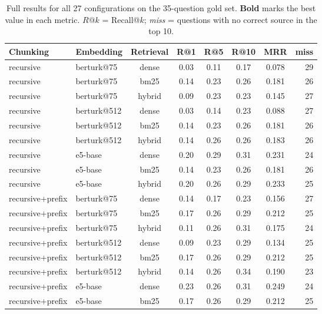 \documentclass[11pt,a4paper,twocolumn]{article}
\begin{document}
\begin{table}[t]
\centering
\caption{Full results for all 27 configurations on the 35-question gold set. \textbf{Bold} marks the best value in each metric. $R@k$ = Recall@$k$; \textit{miss} = questions with no correct source in the top 10.}
\label{tab:full}
\small
\begin{tabular}{@{}llcccccr@{}}
\toprule
\textbf{Chunking} & \textbf{Embedding} & \textbf{Retrieval} & \textbf{R@1} & \textbf{R@5} & \textbf{R@10} & \textbf{MRR} & \textbf{miss} \\
\midrule
recursive           & berturk@75  & dense  & 0.03 & 0.11 & 0.17 & 0.078 & 29 \\
recursive           & berturk@75  & bm25   & 0.14 & 0.23 & 0.26 & 0.181 & 26 \\
recursive           & berturk@75  & hybrid & 0.09 & 0.23 & 0.23 & 0.145 & 27 \\
recursive           & berturk@512 & dense  & 0.03 & 0.14 & 0.23 & 0.088 & 27 \\
recursive           & berturk@512 & bm25   & 0.14 & 0.23 & 0.26 & 0.181 & 26 \\
recursive           & berturk@512 & hybrid & 0.14 & 0.26 & 0.26 & 0.183 & 26 \\
recursive           & e5-base     & dense  & 0.20 & 0.29 & 0.31 & 0.231 & 24 \\
recursive           & e5-base     & bm25   & 0.14 & 0.23 & 0.26 & 0.181 & 26 \\
recursive           & e5-base     & hybrid & 0.20 & 0.26 & 0.29 & 0.233 & 25 \\
\midrule
recursive+prefix    & berturk@75  & dense  & 0.14 & 0.17 & 0.23 & 0.156 & 27 \\
recursive+prefix    & berturk@75  & bm25   & 0.17 & 0.26 & 0.29 & 0.212 & 25 \\
recursive+prefix    & berturk@75  & hybrid & 0.11 & 0.26 & 0.31 & 0.175 & 24 \\
recursive+prefix    & berturk@512 & dense  & 0.09 & 0.23 & 0.29 & 0.134 & 25 \\
recursive+prefix    & berturk@512 & bm25   & 0.17 & 0.26 & 0.29 & 0.212 & 25 \\
recursive+prefix    & berturk@512 & hybrid & 0.14 & 0.26 & 0.34 & 0.190 & 23 \\
recursive+prefix    & e5-base     & dense  & 0.23 & 0.26 & 0.31 & 0.249 & 24 \\
recursive+prefix    & e5-base     & bm25   & 0.17 & 0.26 & 0.29 & 0.212 & 25 \\

\end{tabular}
\end{table}
\end{document}
